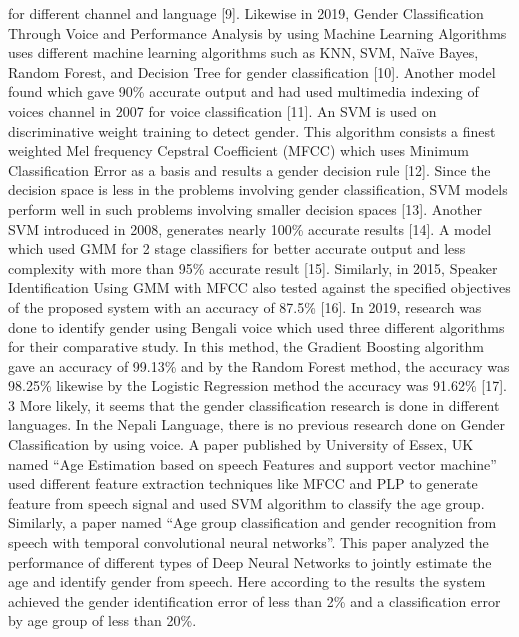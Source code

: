 \documentclass[a4paper,12pt]{article}
\begin{document}
{for different channel and language [9]. Likewise in 2019, Gender Classification Through Voice
and Performance Analysis by using Machine Learning Algorithms uses different machine
learning algorithms such as KNN, SVM, Naïve Bayes, Random Forest, and Decision Tree for
gender classification [10]. Another model found which gave 90\% accurate output and had used
multimedia indexing of voices channel in 2007 for voice classification [11]. An SVM is used
on discriminative weight training to detect gender. This algorithm consists a finest weighted
Mel frequency Cepstral Coefficient (MFCC) which uses Minimum Classification Error as a
basis and results a gender decision rule [12]. Since the decision space is less in the problems
involving gender classification, SVM models perform well in such problems involving smaller
decision spaces [13]. Another SVM introduced in 2008, generates nearly 100\% accurate results
[14]. A model which used GMM for 2 stage classifiers for better accurate output and less
complexity with more than 95\% accurate result [15]. Similarly, in 2015, Speaker Identification
Using GMM with MFCC also tested against the specified objectives of the proposed system
with an accuracy of 87.5\% [16]. In 2019, research was done to identify gender using Bengali voice which used three different algorithms for their comparative study. In this method, the
Gradient Boosting algorithm gave an accuracy of 99.13\% and by the Random Forest method,
the accuracy was 98.25\% likewise by the Logistic Regression method the accuracy was 91.62\%
[17]. 3 More likely, it seems that the gender classification research is done in different
languages. In the Nepali Language, there is no previous research done on Gender Classification
by using voice.
A paper published by University of Essex, UK named “Age Estimation based on speech
Features and support vector machine” used different feature extraction techniques like MFCC
and PLP to generate feature from speech signal and used SVM algorithm to classify the age
group. Similarly, a paper named “Age group classification and gender recognition from speech
with temporal convolutional neural networks”. This paper analyzed the performance of
different types of Deep Neural Networks to jointly estimate the age and identify gender from
speech. Here according to the results the system achieved the gender identification error of less
than 2\% and a classification error by age group of less than 20\%.}
\end{document}

